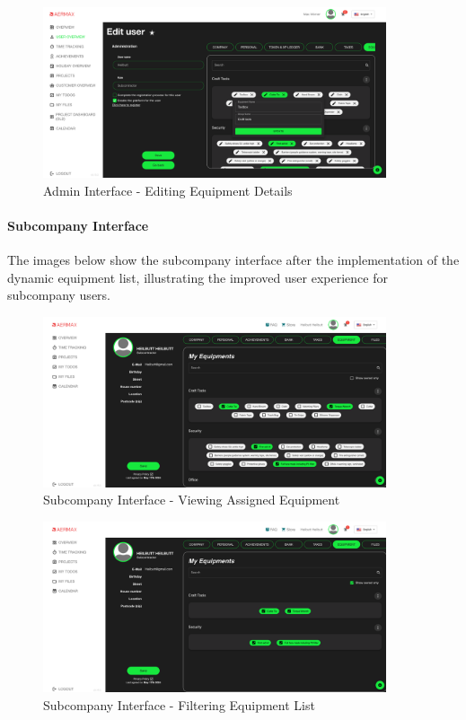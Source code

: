 \begin{figure}[H]
    \centering
    \includegraphics[width=0.9\textwidth]{src/assets/images/admin2.png}
    \caption{Admin Interface - Editing Equipment Details}
    \label{fig:admin_interface_2}
\end{figure}

\paragraph{Subcompany Interface}
The images below show the subcompany interface after the implementation of the dynamic equipment list, illustrating the improved user experience for subcompany users.

\begin{figure}[H]
    \centering
    \includegraphics[width=0.9\textwidth]{src/assets/images/Interface1.png}
    \caption{Subcompany Interface - Viewing Assigned Equipment}
    \label{fig:subcompany_interface_1}
\end{figure}

\begin{figure}[H]
    \centering
    \includegraphics[width=0.9\textwidth]{src/assets/images/Interface2.png}
    \caption{Subcompany Interface - Filtering Equipment List}
    \label{fig:subcompany_interface_2}
\end{figure}


